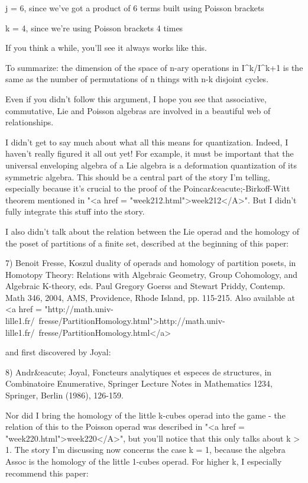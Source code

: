 j = 6, since we've got a product of 6 terms built using Poisson
brackets

k = 4, since we're using Poisson brackets 4 times

If you think a while, you'll see it always works like this.

To summarize: the dimension of the space of n-ary operations in
I^{k}/I^{k+1} is the same as the number of permutations of n
things with n-k disjoint cycles.  

Even if you didn't follow this argument, I hope you see that
associative, commutative, Lie and Poisson algebras are involved in a
beautiful web of relationships.  

I didn't get to say much about what all this means for quantization.
Indeed, I haven't really figured it all out yet!  For example, it must
be important that the universal enveloping algebra of a Lie algebra is
a deformation quantization of its symmetric algebra.  This should be a
central part of the story I'm telling, especially because it's crucial
to the proof of the Poincar&eacute;-Birkoff-Witt theorem mentioned in
"<a href = "week212.html">week212</A>".  But I didn't fully
integrate this stuff into the story.

I also didn't talk about the relation between the Lie operad and
the homology of the poset of partitions of a finite set, described
at the beginning of this paper:

7) Benoit Fresse, Koszul duality of operads and homology of
partition posets, in Homotopy Theory: Relations with Algebraic 
Geometry, Group Cohomology, and Algebraic K-theory, eds. 
Paul Gregory Goerss and Stewart Priddy, Contemp. Math 346, 
2004, AMS, Providence, Rhode Island, pp. 115-215.
Also available at <a href = "http://math.univ-lille1.fr/~fresse/PartitionHomology.html">http://math.univ-lille1.fr/~fresse/PartitionHomology.html</a>

and first discovered by Joyal:

8) Andr&eacute; Joyal, Foncteurs analytiques et especes de structures, in 
Combinatoire Enumerative, Springer Lecture Notes in Mathematics 1234, 
Springer, Berlin (1986), 126-159. 

Nor did I bring the homology of the little k-cubes operad into the
game - the relation of this to the Poisson operad was described in
"<a href = "week220.html">week220</A>", but you'll notice
that this only talks about k > 1.  The story I'm discussing now
concerns the case k = 1, because the algebra Assoc is the homology of
the little 1-cubes operad.  For higher k, I especially recommend this
paper:

